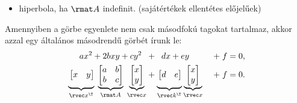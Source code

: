 \documentclass[a4paper, 12pt]{scrartcl}
\begin{document}
\begin{blueBox}
\begin{itemize}
    \item hiperbola, ha $\rmat A$ indefinit.
          \hfill (sajátértékek ellentétes előjelűek)
  \end{itemize}
  Amennyiben a görbe egyenlete nem csak másodfokú tagokat tartalmaz, akkor azzal
  egy általános másodrendű görbét írunk le:
  \begin{alignat*}{9}
    a x^2 + 2b x y + c y^2 \;\;
     & + \;\;
    d x + e y
     & \; + \; f = 0
    \text,
    \\
    \underbrace{
      \vphantom{\begin{bmatrix} x \\ y \end{bmatrix}}
      \begin{bmatrix}
        x & y
      \end{bmatrix}
    }_{\rvec x^\T}
    \;
    \underbrace{
      \begin{bmatrix}
        a & b \\
        b & c
      \end{bmatrix}
    }_{\rmat A}
    \;
    \underbrace{
      \begin{bmatrix}
        x \\
        y
      \end{bmatrix}
    }_{\rvec x}
     & +
    \underbrace{
      \vphantom{\begin{bmatrix} x \\ y \end{bmatrix}}
      \begin{bmatrix}
        d & e
      \end{bmatrix}
    }_{\rvec k^\T}
    \underbrace{
      \;
      \begin{bmatrix}
        x \\
        y
      \end{bmatrix}
      \;
    }_{\rvec x}
     & \; + \; f = 0
    \text.
  \end{alignat*}


\end{blueBox}
\end{document}
